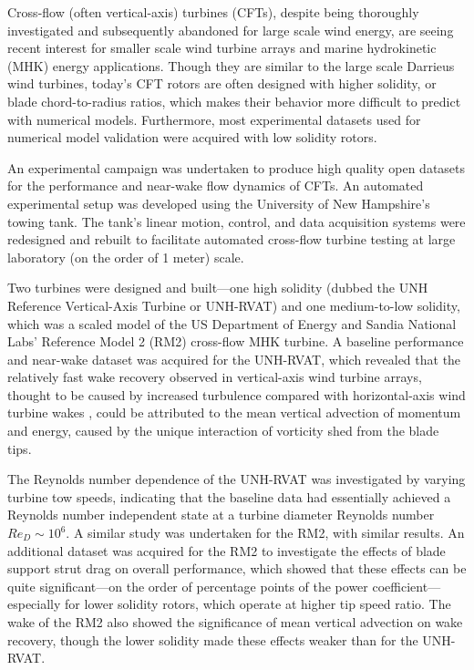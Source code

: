 \begin{Abstractpage}

\setlength{\baselineskip}{1.5\baselineskip}
{

Cross-flow (often vertical-axis) turbines (CFTs), despite being thoroughly
investigated and subsequently abandoned for large scale wind energy, are seeing
recent interest for smaller scale wind turbine arrays and marine hydrokinetic
(MHK) energy applications. Though they are similar to the large scale Darrieus
wind turbines, today's CFT rotors are often designed with higher solidity, or
blade chord-to-radius ratios, which makes their behavior more difficult to
predict with numerical models. Furthermore, most experimental datasets used for
numerical model validation were acquired with low solidity rotors.

An experimental campaign was undertaken to produce high quality open datasets
for the performance and near-wake flow dynamics of CFTs. An automated
experimental setup was developed using the University of New Hampshire's towing
tank. The tank's linear motion, control, and data acquisition systems were
redesigned and rebuilt to facilitate automated cross-flow turbine testing at
large laboratory (on the order of 1 meter) scale.

Two turbines were designed and built---one high solidity (dubbed the UNH
Reference Vertical-Axis Turbine or UNH-RVAT) and one medium-to-low solidity,
which was a scaled model of the US Department of Energy and Sandia National
Labs' Reference Model 2 (RM2) cross-flow MHK turbine. A baseline performance and
near-wake dataset was acquired for the UNH-RVAT, which revealed that the
relatively fast wake recovery observed in vertical-axis wind turbine arrays,
thought to be caused by increased turbulence compared with horizontal-axis wind
turbine wakes \cite{Kinzel2012}, could be attributed to the mean vertical
advection of momentum and energy, caused by the unique interaction of vorticity
shed from the blade tips.

The Reynolds number dependence of the UNH-RVAT was investigated by varying
turbine tow speeds, indicating that the baseline data had essentially achieved a
Reynolds number independent state at a turbine diameter Reynolds number $Re_D
\sim 10^6$. A similar study was undertaken for the RM2, with similar results. An
additional dataset was acquired for the RM2 to investigate the effects of blade
support strut drag on overall performance, which showed that these effects can
be quite significant---on the order of percentage points of the power
coefficient---especially for lower solidity rotors, which operate at higher tip
speed ratio. The wake of the RM2 also showed the significance of mean vertical
advection on wake recovery, though the lower solidity made these effects weaker
than for the UNH-RVAT.

}
\end{Abstractpage}
